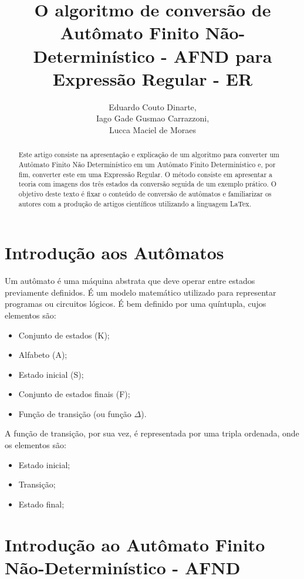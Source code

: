 \documentclass[a4paper,10pt]{article} %
\title{O algoritmo de conversão de Autômato Finito Não-Determinístico - AFND para Expressão Regular - ER}
\author{Eduardo Couto Dinarte,\\ Iago Gade Gusmao Carrazzoni,\\ Lucca Maciel de Moraes}
\begin{document}
\maketitle

\begin{abstract}

Este artigo consiste na apresenta\c{c}\~{a}o e explica\c{c}\~{a}o de um algoritmo para converter um Aut\^{o}mato Finito N\~{a}o Determin\'{i}stico em um Aut\^{o}mato Finito Determin\'{i}stico e, por fim, converter este em uma Express\~{a}o Regular. O m\'{e}todo consiste em apresentar a teoria com imagens dos tr\^{e}s estados da convers\~{a}o seguida de um exemplo pr\'{a}tico. O objetivo deste texto \'{e} fixar o conte\'{u}do de convers\~{a}o de aut\^{o}matos e familiarizar os autores com a produ\c{c}\~{a}o de artigos cient\'{i}ficos utilizando a linguagem LaTex.

\end{abstract}

\newpage
\section{Introdução aos Autômatos}

Um autômato é uma máquina abstrata que deve operar entre estados previamente definidos. É um modelo matemático utilizado para representar programas ou circuitos lógicos. É bem definido por uma quíntupla, cujos elementos são:
    \begin{itemize}
        \item Conjunto de estados (K);
        \item Alfabeto (A);
        \item Estado inicial (S);
        \item Conjunto de estados finais (F);
        \item Função de transição (ou função {$\Delta$}).
    \end{itemize}

A função de transição, por sua vez, é representada por uma tripla ordenada, onde os elementos são:
    \begin{itemize}
        \item Estado inicial;
        \item Transição;
        \item Estado final;
    \end{itemize}

\newpage
\section{Introdução ao Autômato Finito Não-Determinístico - AFND}
\end{document}
